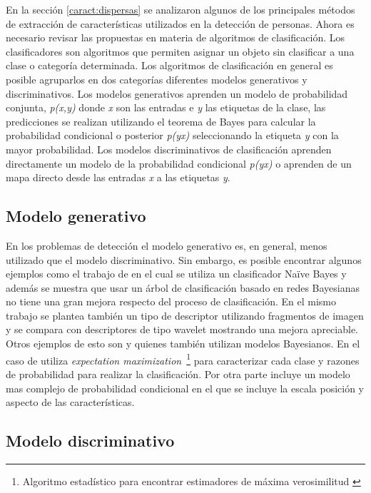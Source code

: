 En la sección \ref{caract:dispersas} se analizaron algunos de los principales métodos de extracción de características utilizados en la detección de personas. Ahora es necesario revisar las propuestas en materia de algoritmos de clasificación. Los clasificadores son algoritmos que permiten asignar un objeto sin clasificar a una clase o categoría determinada. Los algoritmos de clasificación en general es posible agruparlos en dos categorías diferentes \citep{ng2002} modelos generativos y discriminativos. Los modelos generativos aprenden un modelo de probabilidad conjunta, \textit{p(x,y)} donde \textit{x} son las entradas e \textit{y} las etiquetas de la clase, las predicciones se realizan utilizando el teorema de Bayes para calcular la probabilidad condicional o posterior \textit{p(y\textbar x)} seleccionando la etiqueta \textit{y} con la mayor probabilidad. Los modelos discriminativos de clasificación aprenden directamente un modelo de la probabilidad condicional \textit{p(y\textbar x)} o aprenden de un mapa directo desde las entradas \textit{x} a las etiquetas \textit{y}.

\subsection{Modelo generativo}

En los problemas de detección el modelo generativo es, en general, menos utilizado que el modelo discriminativo. Sin embargo, es posible encontrar algunos ejemplos como el trabajo de \cite{Vidal-Naquet2003} en el cual se utiliza un clasificador Naïve Bayes y además se muestra que usar un árbol de clasificación basado en redes Bayesianas no tiene una gran mejora respecto del proceso de clasificación. En el mismo trabajo se plantea también un tipo de descriptor utilizando fragmentos de imagen y se compara con descriptores de tipo wavelet mostrando una mejora apreciable. Otros ejemplos de esto son \cite{Weber2000} y \cite{Fergus2003} quienes también utilizan modelos Bayesianos. En el caso de \cite{Weber2000} utiliza \textit{expectation maximization}~\footnote{Algoritmo estadístico para encontrar estimadores de máxima verosimilitud \citep{dempster1977maximum}} para caracterizar cada clase y razones de probabilidad para realizar la clasificación. Por otra parte \cite{Fergus2003} incluye un modelo mas complejo de probabilidad condicional en el que se incluye la escala posición y aspecto de las características.

\subsection{Modelo discriminativo}

